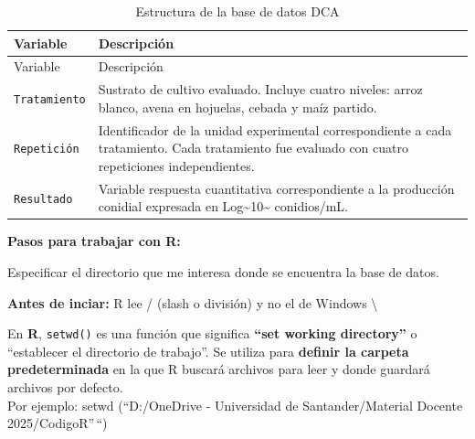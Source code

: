 \documentclass[
  spanish,
  letterpaper,
  DIV=11,
  numbers=noendperiod]{scrreprt}
\begin{document}
\begin{longtable}[]{@{}
  >{\raggedright\arraybackslash}p{}
  >{\raggedright\arraybackslash}p{}@{}}
\caption{Estructura de la base de datos
DCA}\label{tbl-estructura}\tabularnewline
\toprule\noalign{}
\begin{minipage}[b]{\linewidth}\raggedright
Variable
\end{minipage} & \begin{minipage}[b]{\linewidth}\raggedright
Descripción
\end{minipage} \\
\midrule\noalign{}
\endfirsthead
\toprule\noalign{}
\begin{minipage}[b]{\linewidth}\raggedright
Variable
\end{minipage} & \begin{minipage}[b]{\linewidth}\raggedright
Descripción
\end{minipage} \\
\midrule\noalign{}
\endhead
\bottomrule\noalign{}
\endlastfoot
\texttt{Tratamiento} & Sustrato de cultivo evaluado. Incluye cuatro
niveles: arroz blanco, avena en hojuelas, cebada y maíz partido. \\
\texttt{Repetición} & Identificador de la unidad experimental
correspondiente a cada tratamiento. Cada tratamiento fue evaluado con
cuatro repeticiones independientes. \\
\texttt{Resultado} & Variable respuesta cuantitativa correspondiente a
la producción conidial expresada en
Log\textasciitilde10\textasciitilde{} conidios/mL. \\
\end{longtable}

\textbf{Pasos para trabajar con R:}

Especificar el directorio que me interesa donde se encuentra la base de
datos.

\begin{tcolorbox}[enhanced jigsaw, colback=white, breakable, toptitle=1mm, toprule=.15mm, colbacktitle=quarto-callout-tip-color!10!white, bottomrule=.15mm, coltitle=black, titlerule=0mm, opacityback=0, leftrule=.75mm, bottomtitle=1mm, colframe=quarto-callout-tip-color-frame, left=2mm, title=\textcolor{quarto-callout-tip-color}{\faLightbulb}\hspace{0.5em}{Tip}, rightrule=.15mm, opacitybacktitle=0.6, arc=.35mm]

\textbf{Antes de inciar:} R lee / (slash o división) y no el de Windows
\textbackslash{}

En \textbf{R}, \texttt{setwd()} es una función que significa
\textbf{``set working directory''} o ``establecer el directorio de
trabajo''. Se utiliza para \textbf{definir la carpeta predeterminada} en
la que R buscará archivos para leer y donde guardará archivos por
defecto.\\

Por ejemplo: setwd (``D:/OneDrive - Universidad de Santander/Material
Docente 2025/CodigoR''\,``)

\end{tcolorbox}
\end{document}

